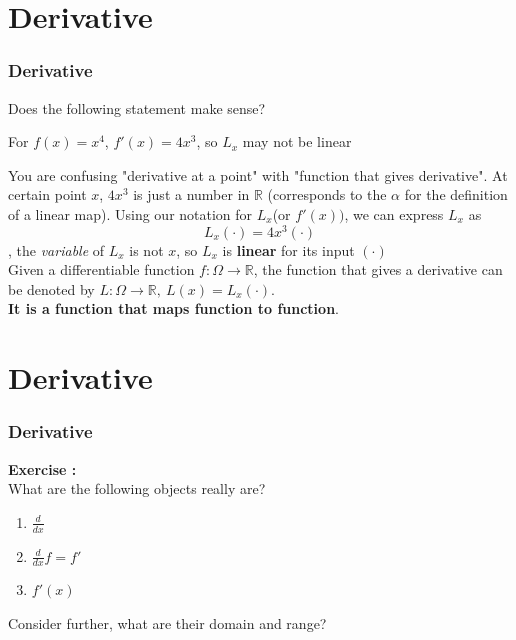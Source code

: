 \documentclass[12pt, t]{beamer}
\renewcommand{\emph}[1]{{\color{Turquoise3}\textsl{#1}}}
\begin{document}
\section{Derivative}
\begin{frame}
    \frametitle{Derivative}
    Does the following statement make sense?

\vspace{0.5em}
    \begin{center}
        For $f(x)=x^4$, $f'(x)=4x^3$, so $L_x$ may not be linear
    \end{center}
\vspace{0.5em}

\hspace{1em} You are confusing "derivative at a point" with "function that gives derivative".
At certain point $x$, $4x^3$ is just a number in $\mathbb{R}$ (corresponds to the $\alpha$ for the definition of a linear map). 
Using our notation for $L_x$(or $f'(x))$, we can express $L_x$ as 
\begin{equation*}
    L_x(\cdot)=4x^3(\cdot)
\end{equation*}
, the \emph{variable} of $L_x$ is not $x$, so $L_x$ is \textbf{linear} for its input $(\cdot)$\\
\vspace{1em}
Given a differentiable function $f:\Omega\rightarrow\mathbb{R}$, the function 
that gives a derivative can be denoted by $L:\Omega\rightarrow\mathbb{R},\ L(x)=L_x(\cdot)$.\\
\textbf{It is a function that maps function to function}.
\end{frame}


\section{Derivative}
\begin{frame}
    \frametitle{Derivative}
\textbf{Exercise : }\\
\vspace{0.5em}
\hspace{1em}
What are the following objects really are?

\begin{enumerate}
    \item $\frac{d}{dx}$
    \vspace{1em}
    \item $\frac{d}{dx}f=f'$
    \vspace{1em}
    \item $f'(x)$
    \vspace{1em}
\end{enumerate}

Consider further, what are their domain and range?
\end{frame}
\end{document}
